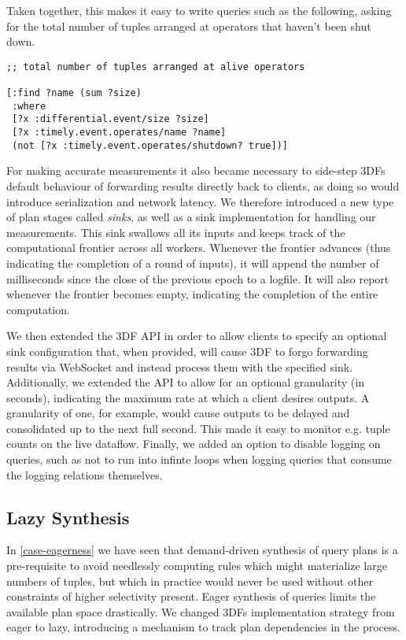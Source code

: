 \documentclass[../index.tex]{subfiles}
\begin{document}
Taken together, this makes it easy to write queries such as the
following, asking for the total number of tuples arranged at operators
that haven't been shut down.

\begin{lstlisting}[language=datalog, style=colorlog]
;; total number of tuples arranged at alive operators

[:find ?name (sum ?size)
 :where
 [?x :differential.event/size ?size]
 [?x :timely.event.operates/name ?name]  
 (not [?x :timely.event.operates/shutdown? true])]
\end{lstlisting}

For making accurate measurements it also became necessary to side-step
3DFs default behaviour of forwarding results directly back to clients,
as doing so would introduce serialization and network latency. We
therefore introduced a new type of plan stages called \emph{sinks}, as
well as a sink implementation for handling our measurements. This sink
swallows all its inputs and keeps track of the computational frontier
across all workers. Whenever the frontier advances (thus indicating
the completion of a round of inputs), it will append the number of
milliseconds since the close of the previous epoch to a logfile. It
will also report whenever the frontier becomes empty, indicating the
completion of the entire computation.

We then extended the 3DF API in order to allow clients to specify an
optional sink configuration that, when provided, will cause 3DF to
forgo forwarding results via WebSocket and instead process them with
the specified sink. Additionally, we extended the API to allow for an
optional granularity (in seconds), indicating the maximum rate at
which a client desires outputs. A granularity of one, for example,
would cause outputs to be delayed and consolidated up to the next full
second. This made it easy to monitor e.g. tuple counts on the live
dataflow. Finally, we added an option to disable logging on queries,
such as not to run into infinte loops when logging queries that
consume the logging relations themselves.

\subsection{Lazy Synthesis} \label{lazy-synthesis}

In \autoref{case-eagerness} we have seen that demand-driven synthesis
of query plans is a pre-requisite to avoid needlessly computing rules
which might materialize large numbers of tuples, but which in practice
would never be used without other constraints of higher selectivity
present. Eager synthesis of queries limits the available plan space
drastically. We changed 3DFs implementation strategy from eager to
lazy, introducing a mechanism to track plan dependencies in the
process.
\end{document}
